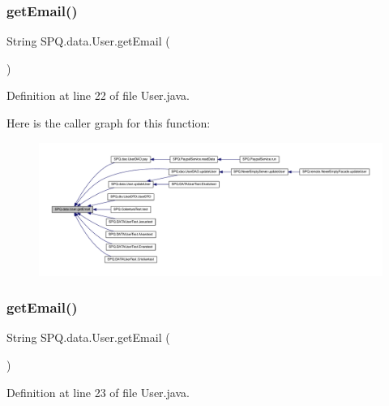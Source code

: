 \subsubsection{\texorpdfstring{get\+Email()}{getEmail()}\hspace{0.1cm}{\footnotesize\ttfamily [2/4]}}
{\footnotesize\ttfamily String S\+P\+Q.\+data.\+User.\+get\+Email (\begin{DoxyParamCaption}{ }\end{DoxyParamCaption})}



Definition at line 22 of file User.\+java.

Here is the caller graph for this function\+:
\nopagebreak
\begin{figure}[H]
\begin{center}
\leavevmode
\includegraphics[width=350pt]{class_s_p_q_1_1data_1_1_user_a4f3ae0062ee7529314a5b791707ff4b4_icgraph}
\end{center}
\end{figure}
\mbox{\label{class_s_p_q_1_1data_1_1_user_a4f3ae0062ee7529314a5b791707ff4b4}} 
\subsubsection{\texorpdfstring{get\+Email()}{getEmail()}\hspace{0.1cm}{\footnotesize\ttfamily [3/4]}}
{\footnotesize\ttfamily String S\+P\+Q.\+data.\+User.\+get\+Email (\begin{DoxyParamCaption}{ }\end{DoxyParamCaption})}



Definition at line 23 of file User.\+java.

\mbox{\label{class_s_p_q_1_1data_1_1_user_a4f3ae0062ee7529314a5b791707ff4b4}} 
